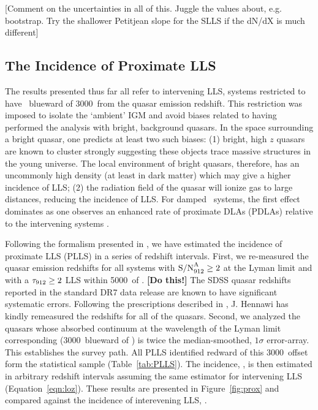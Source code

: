 \documentclass[12pt,preprint]{aastex}
\begin{document}
[Comment on the uncertainties in all of this. Juggle the values
about, e.g. bootstrap.  Try the shallower Petitjean slope for the SLLS
if the dN/dX is much different]





\subsection{The Incidence of Proximate LLS}


The results presented thus far all refer to intervening LLS, systems
restricted to have \zlls\ blueward of 3000\kms\ from the quasar
emission redshift.  This restriction was imposed to isolate the
`ambient' IGM and avoid biases related to having performed
the analysis with bright, background quasars.
In the space surrounding a bright quasar, one predicts at least two
such biases:
(1) bright, high $z$ quasars are known to cluster strongly
\citep[$r_0 \approx ? \, h^{-1} \rm Mpc$;][]{shen07}
suggesting these objects trace massive structures in the young universe.
The local environment of bright quasars, therefore, has an uncommonly
high density (at least in dark matter) which may give a higher
incidence of LLS;
(2) the radiation field of the quasar will ionize gas to large
distances, reducing the incidence of LLS.
For damped \lya\ systems, the first effect dominates
as one observes an enhanced rate of proximate DLAs (PDLAs)
relative to the intervening systems \citep{reb06,phh08}.

Following the formalism presented in \cite{phh08}, we have estimated
the incidence of proximate LLS (PLLS) in a series of redshift intervals.
First, we re-measured the quasar emission redshifts for all
systems with ${\rm S/N}^{\rm A}_{912} \ge 2$ at the Lyman limit and with 
a $\tau_{\rm 912} \ge 2$ LLS within 5000\kms\ of \zem.
{\bf [Do this!]}
The SDSS quasar redshifts reported in the standard DR7 data release
are known to have significant systematic errors. 
Following the prescriptions described in \cite{shen07},
J. Hennawi has kindly remeasured the redshifts for all of the quasars.
Second, we analyzed the quasars whose absorbed continuum at the wavelength
of the Lyman limit corresponding (3000\kms\ blueward of \zem) is
twice the median-smoothed, $1\sigma$ error-array.  This establishes
the survey path.  All PLLS identified redward of this 3000\kms\ offset
form the statistical sample (Table~\ref{tab:PLLS}).
The incidence, \lplls, is then estimated in arbitrary redshift
intervals assuming the same estimator for intervening 
LLS (Equation~\ref{eqn:loz}).
These results are presented in Figure~\ref{fig:prox} and compared
against the incidence of interevening LLS, \lzlls.
\end{document}
